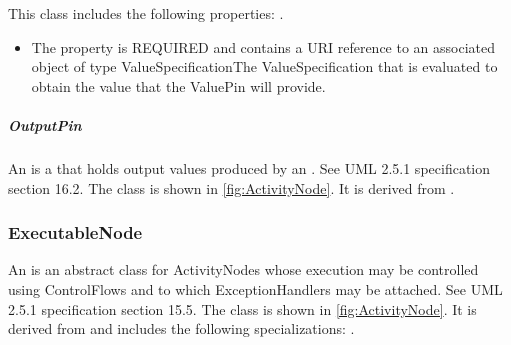 This class includes the following properties: . %
\begin{itemize}%
\item%
The  property is REQUIRED and contains a URI reference to an associated object of type ValueSpecificationThe ValueSpecification that is evaluated to obtain the value that the ValuePin will provide.%
\end{itemize}%
\subparagraph{OutputPin}%
\label{sec:uml:OutputPin}%
An  is a  that holds output values produced by an . See UML 2.5.1 specification section 16.2.%
\newline%
\linebreak%
The  class is shown in \ref{fig:ActivityNode}. It is derived from .%
%
\subsubsection{ExecutableNode}%
\label{sec:uml:ExecutableNode}%
An  is an abstract class for ActivityNodes whose execution may be controlled using ControlFlows and to which ExceptionHandlers may be attached. See UML 2.5.1 specification section 15.5.%
\newline%
\linebreak%
The  class is shown in \ref{fig:ActivityNode}. It is derived from  and includes the following specializations: . %
%
